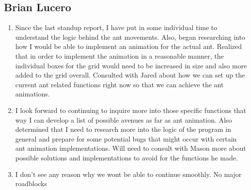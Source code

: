 \documentclass{article}
\begin{document}
\subsection{Brian Lucero}
\begin{enumerate}
\item Since the last standup report, I have put in some individual time to understand the logic behind the ant movements. Also, began researching into how I would be able to implement an animation for the actual ant. Realized that in order to implement the animation in a reasonable manner, the individual boxes for the grid would need to be increased in size and also more added to the grid overall. Consulted with Jared about how we can set up the current ant related functions right now so that we can achieve the ant animations.
\item I look forward to continuing to inquire more into those specific functions that way I can develop a list of possible avenues as far as ant animation.  Also determined that I need to research more into the logic of the program in general and prepare for some potential bugs that might occur with certain ant animation implementations. Will need to consult with Mason more about possible solutions and implementations to avoid for the functions he made. 
\item I don't see any reason why we wont be able to continue smoothly. No major roadblocks
\end{enumerate}
\end{document}
